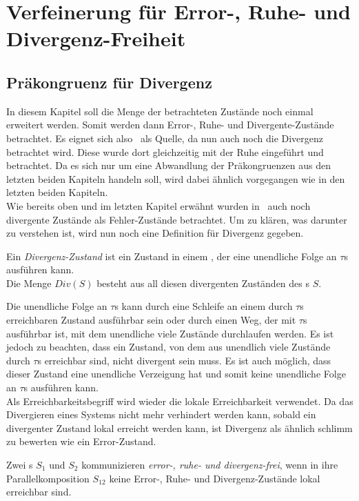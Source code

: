 \chapter{Verfeinerung für Error-, Ruhe- und Divergenz-Freiheit}

\section{Präkongruenz für Divergenz}

In diesem Kapitel soll die Menge der betrachteten Zustände noch einmal
erweitert werden. Somit werden dann Error-, Ruhe- und
Divergente-Zustände betrachtet. Es eignet sich also~\cite{Chilton2013} als
Quelle, da nun auch noch die Divergenz betrachtet wird. Diese wurde dort
gleichzeitig mit der Ruhe eingeführt und betrachtet. Da es sich nur um eine
Abwandlung der Präkongruenzen aus den letzten beiden Kapiteln handeln soll, wird
dabei ähnlich vorgegangen wie in den letzten beiden Kapiteln.\\
Wie bereits oben und im letzten Kapitel erwähnt wurden in~\cite{Chilton2013}
auch noch divergente Zustände als Fehler-Zustände betrachtet. Um zu klären, was
darunter zu verstehen ist, wird nun noch eine Definition für Divergenz gegeben.

\begin{Def}[Divergenz]
  Ein \emph{Divergenz-Zustand} ist ein Zustand in einem \EIO{}, der eine
  unendliche Folge an $\tau$s ausführen kann.\\
  Die Menge $Div(S)$ besteht aus all diesen divergenten Zuständen des
  \EIO{}s $S$.
\end{Def}

Die unendliche Folge an $\tau$s kann durch eine Schleife an einem durch $\tau$s
erreichbaren Zustand ausführbar sein oder durch einen Weg, der mit $\tau$s
ausführbar ist, mit dem
unendliche viele Zustände durchlaufen werden. Es ist jedoch zu beachten, dass
ein Zustand, von dem aus unendlich viele Zustände durch $\tau$s erreichbar sind,
nicht divergent sein muss. Es ist auch möglich, dass dieser Zustand eine
unendliche Verzeigung hat und somit keine unendliche Folge an $\tau$s ausführen
kann.\\
Als Erreichbarkeitsbegriff wird wieder die lokale Erreichbarkeit verwendet.
Da das Divergieren eines Systems nicht mehr verhindert werden kann, sobald ein
divergenter Zustand lokal erreicht werden kann, ist Divergenz als ähnlich
\glqq{}schlimm\grqq{} zu bewerten wie ein Error-Zustand.

\begin{Def}
  Zwei \linebreak\EIO{}s $S_1$ und $S_2$ kommunizieren \emph{error-, ruhe- und
  divergenz-frei}, wenn in ihre Parallelkomposition $S_{12}$ keine Error-,
  Ruhe- und Divergenz-Zustände lokal erreichbar sind.
\end{Def}

